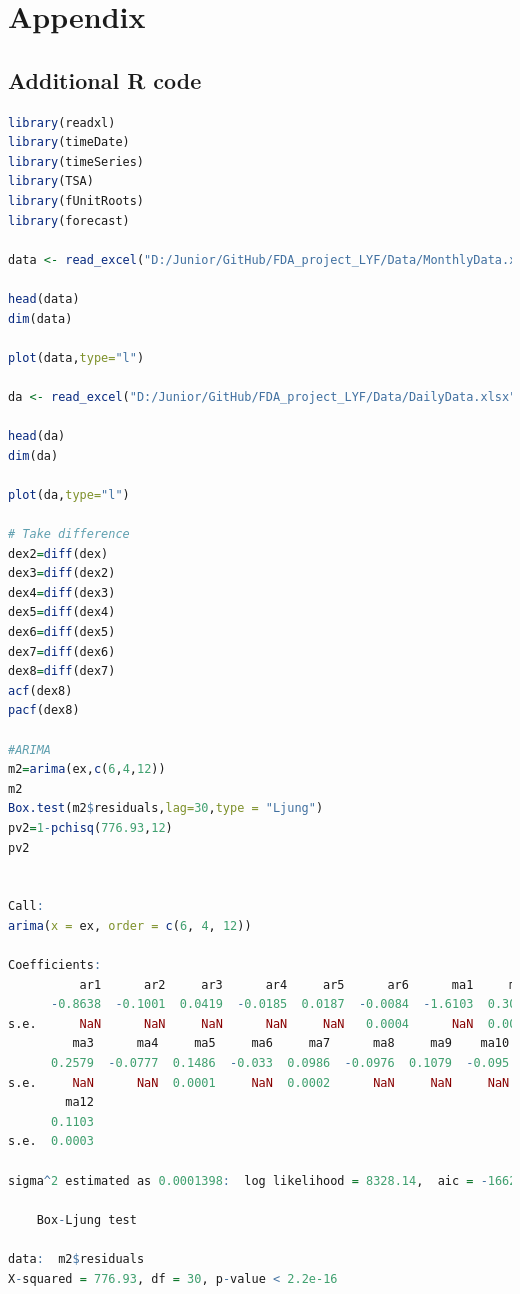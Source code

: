 \documentclass[12pt, a4paper, titlepage]{article}
\begin{document}
\section*{Appendix}
\subsection*{Additional R code}
\begin{lstlisting}[language=R] 
library(readxl)
library(timeDate)
library(timeSeries)
library(TSA)
library(fUnitRoots)
library(forecast)

data <- read_excel("D:/Junior/GitHub/FDA_project_LYF/Data/MonthlyData.xls")

head(data)
dim(data)

plot(data,type="l")

da <- read_excel("D:/Junior/GitHub/FDA_project_LYF/Data/DailyData.xlsx")

head(da)
dim(da)

plot(da,type="l")

# Take difference
dex2=diff(dex)
dex3=diff(dex2)
dex4=diff(dex3)
dex5=diff(dex4)
dex6=diff(dex5)
dex7=diff(dex6)
dex8=diff(dex7)
acf(dex8)
pacf(dex8)

#ARIMA
m2=arima(ex,c(6,4,12))
m2
Box.test(m2$residuals,lag=30,type = "Ljung")
pv2=1-pchisq(776.93,12)
pv2


Call:
arima(x = ex, order = c(6, 4, 12))

Coefficients:
          ar1      ar2     ar3      ar4     ar5      ar6      ma1     ma2
      -0.8638  -0.1001  0.0419  -0.0185  0.0187  -0.0084  -1.6103  0.3084
s.e.      NaN      NaN     NaN      NaN     NaN   0.0004      NaN  0.0003
         ma3      ma4     ma5     ma6     ma7      ma8     ma9    ma10     ma11
      0.2579  -0.0777  0.1486  -0.033  0.0986  -0.0976  0.1079  -0.095  -0.1169
s.e.     NaN      NaN  0.0001     NaN  0.0002      NaN     NaN     NaN   0.0004
        ma12
      0.1103
s.e.  0.0003

sigma^2 estimated as 0.0001398:  log likelihood = 8328.14,  aic = -16620.28

	Box-Ljung test

data:  m2$residuals
X-squared = 776.93, df = 30, p-value < 2.2e-16
\end{lstlisting}
\end{document}
